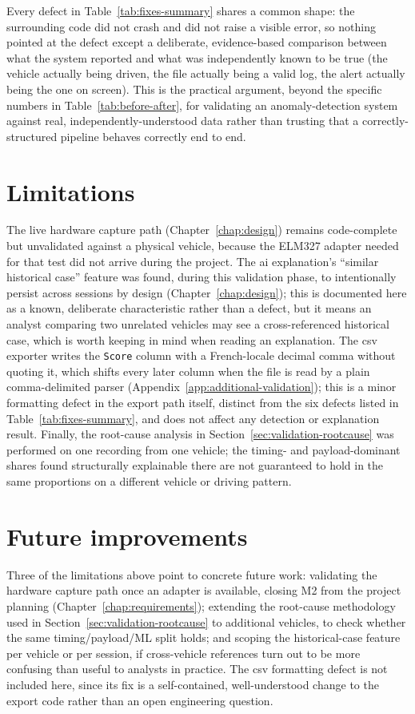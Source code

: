 Every defect in Table~\ref{tab:fixes-summary} shares a common shape: the surrounding code did not crash and did not raise a visible error, so nothing pointed at the defect except a deliberate, evidence-based comparison between what the system reported and what was independently known to be true (the vehicle actually being driven, the file actually being a valid log, the alert actually being the one on screen). This is the practical argument, beyond the specific numbers in Table~\ref{tab:before-after}, for validating an anomaly-detection system against real, independently-understood data rather than trusting that a correctly-structured pipeline behaves correctly end to end.

\section{Limitations}

The live hardware capture path (Chapter~\ref{chap:design}) remains code-complete but unvalidated against a physical vehicle, because the ELM327 adapter needed for that test did not arrive during the project. The \gls{ai} explanation's ``similar historical case'' feature was found, during this validation phase, to intentionally persist across sessions by design (Chapter~\ref{chap:design}); this is documented here as a known, deliberate characteristic rather than a defect, but it means an analyst comparing two unrelated vehicles may see a cross-referenced historical case, which is worth keeping in mind when reading an explanation. The \gls{csv} exporter writes the \texttt{Score} column with a French-locale decimal comma without quoting it, which shifts every later column when the file is read by a plain comma-delimited parser (Appendix~\ref{app:additional-validation}); this is a minor formatting defect in the export path itself, distinct from the six defects listed in Table~\ref{tab:fixes-summary}, and does not affect any detection or explanation result. Finally, the root-cause analysis in Section~\ref{sec:validation-rootcause} was performed on one recording from one vehicle; the timing- and payload-dominant shares found structurally explainable there are not guaranteed to hold in the same proportions on a different vehicle or driving pattern.

\section{Future improvements}

Three of the limitations above point to concrete future work: validating the hardware capture path once an adapter is available, closing M2 from the project planning (Chapter~\ref{chap:requirements}); extending the root-cause methodology used in Section~\ref{sec:validation-rootcause} to additional vehicles, to check whether the same timing/payload/ML split holds; and scoping the historical-case feature per vehicle or per session, if cross-vehicle references turn out to be more confusing than useful to analysts in practice. The \gls{csv} formatting defect is not included here, since its fix is a self-contained, well-understood change to the export code rather than an open engineering question.

